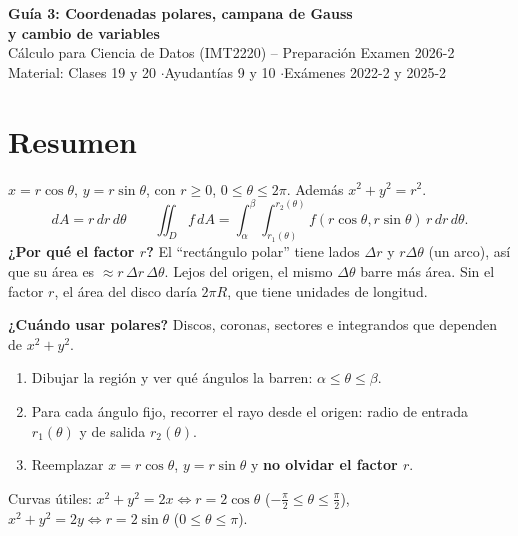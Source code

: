 \documentclass[11pt,a4paper]{article}
\newcommand{\dA}{\,dA}
\begin{document}
\begin{center}
{\LARGE\bfseries Guía 3: Coordenadas polares, campana de Gauss\\[2pt] y cambio de variables}\\[6pt]
{\large Cálculo para Ciencia de Datos (IMT2220) -- Preparación Examen 2026-2}\\[3pt]
{\small Material: Clases 19 y 20 \quad$\cdot$\quad Ayudantías 9 y 10 \quad$\cdot$\quad Exámenes 2022-2 y 2025-2}
\end{center}

\section{Resumen}

\begin{resumen}
$x=r\cos\theta$, $y=r\sin\theta$, con $r\ge0$, $0\le\theta\le2\pi$. Además $x^2+y^2=r^2$.
\[
\boxed{dA=r\,dr\,d\theta}\qquad
\iint_D f\dA=\int_\alpha^\beta\!\!\int_{r_1(\theta)}^{r_2(\theta)} f(r\cos\theta,r\sin\theta)\,r\,dr\,d\theta .
\]
\textbf{¿Por qué el factor $r$?} El ``rectángulo polar'' tiene lados $\Delta r$ y $r\Delta\theta$ (un arco), así que su área es $\approx r\,\Delta r\,\Delta\theta$. Lejos del origen, el mismo $\Delta\theta$ barre más área. Sin el factor $r$, el área del disco daría $2\pi R$, que tiene unidades de longitud.

\textbf{¿Cuándo usar polares?} Discos, coronas, sectores e integrandos que dependen de $x^2+y^2$.
\end{resumen}

\begin{receta}
\begin{enumerate}[leftmargin=*,itemsep=1pt]
\item Dibujar la región y ver qué ángulos la barren: $\alpha\le\theta\le\beta$.
\item Para cada ángulo fijo, recorrer el rayo desde el origen: radio de entrada $r_1(\theta)$ y de salida $r_2(\theta)$.
\item Reemplazar $x=r\cos\theta$, $y=r\sin\theta$ y \textbf{no olvidar el factor $r$}.
\end{enumerate}
Curvas útiles: $x^2+y^2=2x\iff r=2\cos\theta$ ($-\tfrac\pi2\le\theta\le\tfrac\pi2$), \ $x^2+y^2=2y\iff r=2\sin\theta$ ($0\le\theta\le\pi$).
\end{receta}
\end{document}
